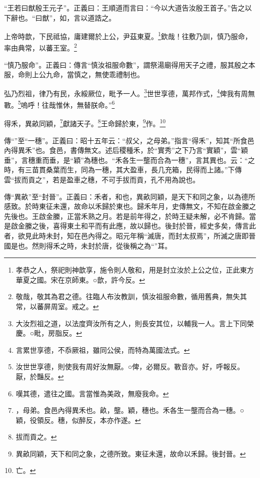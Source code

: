 {\noindent\shu{}\fzkt “王若曰猷殷王元子”。正義曰：王順道而言曰：“今以大道告汝殷王首子。”告之以下辭也。“曰猷”，如，言以道誥之。 \par}

上帝時歆，下民祗協，庸建爾於上公，尹茲東夏。\footnote{孝恭之人，祭祀則神歆享，施令則人敬和，用是封立汝於上公之位，正此東方華夏之國。宋在京師東。○歆，許今反。}欽哉！往敷乃訓，慎乃服命，率由典常，以蕃王室。\footnote{敬哉，敬其為君之德。往臨人布汝教訓，慎汝祖服命數，循用舊典，無失其常，以蕃屏周室。戒之。}

{\noindent\shu{}\fzkt “慎乃服命”。正義曰：傳言“慎汝祖服命數”，謂祭湯廟得用天子之禮，服其殷之本服，命則上公九命，當慎之，無使乖禮制也。 \par}

弘乃烈祖，律乃有民，永綏厥位，毗予一人。\footnote{大汝烈祖之道，以法度齊汝所有之人，則長安其位，以輔我一人。言上下同榮慶。○毗，房脂反。}世世享德，萬邦作式，\footnote{言累世享德，不忝厥祖，雖同公侯，而特為萬國法式。}俾我有周無斁。\footnote{汝世世享德，則使我有周好汝無厭。○俾，必爾反。斁音亦。好，呼報反。厭，於豔反。}嗚呼！往哉惟休，無替朕命。”\footnote{嘆其德，遣往之國。言當惟為美政，無廢我命。}

得禾，異畝同穎，\footnote{，母弟。食邑內得異禾也。畝，壟。穎，穗也。禾各生一壟而合為一穗。○穎，役領反。穗，似醉反，本亦作遂。}獻諸天子。\footnote{拔而貢之。}王命歸於東，\footnote{異畝同穎，天下和同之象，之德所致。東征未還，故命以禾歸。後封晉。}作。\footnote{亡。}


{\noindent\zhuan{}\fzbyks 傳“”至“一穗”。正義曰：昭十五年云：“叔父，之母弟。”指言“得禾”，知其“所食邑內得異禾”也。食邑，書傳無文。述后稷種禾，於“實秀”之下乃言“實穎”，雲“穎垂”，言穗重而垂，是“穎”為穗也。“禾各生一壟而合為一穗”，言其異也。云：“之時，有三苗貫桑葉而生，同為一穗，其大盈車，長几充箱，民得而上諸。”下傳雲“拔而貢之”，若是盈車之穗，不可手拔而貢，孔不用為說也。 \par}

{\noindent\zhuan{}\fzbyks 傳“異畝”至“封晉”。正義曰：禾者，和也，異畝同穎，是天下和同之象，以為德所感致。於時東征未還，故命以禾歸於東也。歸禾年月，史傳無文，不知在啟金縢之先後也。王啟金縢，正當禾熟之月。若是前年得之，於時王疑未解，必不肯歸。當是啟金縢之後，喜得東土和平而有此應，故以歸也。後封於晉，經史多矣，傳言此者，欲見此時未封，知在邑內得之。昭元年稱“滅唐，而封太叔焉”，所滅之唐即晉國是也。然則得禾之時，未封於唐，從後稱之為“”耳。 \par}

